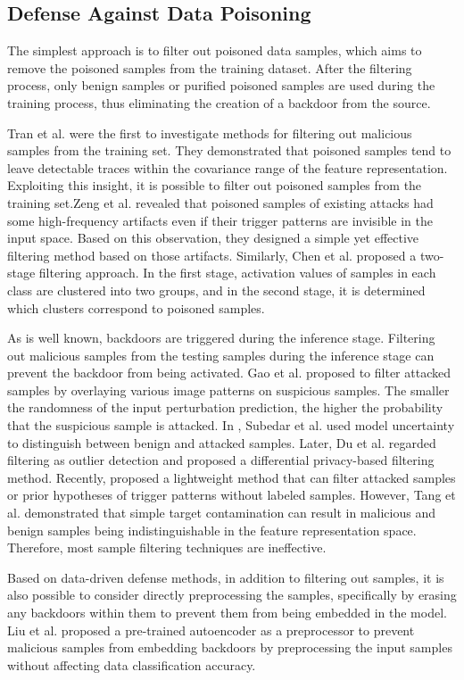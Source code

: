 \documentclass[conference]{IEEEtran}
\begin{document}
\subsection{Defense Against Data Poisoning}
The simplest approach is to filter out poisoned data samples,
which aims to remove the poisoned samples from the training dataset.
After the filtering process, only benign samples or purified poisoned
samples are used during the training process, thus eliminating the
creation of a backdoor from the source.

Tran et al.\cite{b67} were the first to investigate methods for filtering out malicious
samples from the training set. They demonstrated that poisoned samples tend to
leave detectable traces within the covariance range of the feature representation.
Exploiting this insight, it is possible to filter out poisoned samples from
the training set.Zeng et al. \cite{b68} revealed that poisoned samples of
existing attacks had some high-frequency artifacts even if their trigger
patterns are invisible in the input space. Based on this observation,
they designed a simple yet effective filtering method based on those artifacts.
Similarly, Chen et al. \cite{b69}proposed a two-stage filtering approach.
In the first stage, activation values of samples in each class are clustered
into two groups, and in the second stage, it is determined which clusters
correspond to poisoned samples.

As is well known, backdoors are triggered during the inference stage.
Filtering out malicious samples from the testing samples during the inference stage can prevent the backdoor
from being activated. Gao et al. \cite{b71} proposed to filter attacked samples by overlaying various image patterns
on suspicious samples. The smaller the randomness of the input perturbation prediction, the higher the probability
that the suspicious sample is attacked. In \cite{b72}, Subedar et al. used model uncertainty to distinguish between
benign and attacked samples. Later, Du et al. \cite{b73} regarded filtering as outlier detection and proposed a
differential privacy-based filtering method. Recently, \cite{b74} proposed a lightweight method that can filter
attacked samples or prior hypotheses of trigger patterns without labeled samples.
However, Tang et al.\cite{b70} demonstrated that
simple target contamination can result in malicious and benign samples being
indistinguishable in the feature representation space. Therefore, most
sample filtering techniques are ineffective.

Based on data-driven defense methods, in addition to filtering out samples,
it is also possible to consider directly preprocessing the samples,
specifically by erasing any backdoors within them to prevent them from being embedded in the model.
Liu et al.\cite{b75} proposed a pre-trained autoencoder as a preprocessor to prevent malicious samples from embedding backdoors
by preprocessing the input samples without affecting data classification accuracy.
\end{document}

